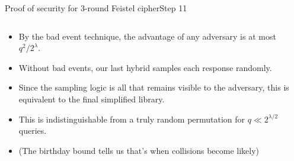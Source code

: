\documentclass[aspectratio=169, lualatex, handout]{beamer}
\begin{document}
\begin{frame}{Proof of security for 3-round Feistel cipher}{Step 11}
	\begin{columns}[c]
		\begin{column}{0.6\textwidth}
			\begin{itemize}[<+->]
				\item By the bad event technique, the advantage of any adversary is at most $q^2/2^{\lambda}$.
				\item Without bad events, our last hybrid samples each response randomly.
				\item Since the sampling logic is all that remains visible to the adversary, this is equivalent to the final simplified library.
				\item This is indistinguishable from a truly random permutation for $q \ll 2^{\lambda/2}$ queries.
				\item (The birthday bound tells us that's when collisions become likely)
			\end{itemize}
		\end{column}
		\begin{column}{0.4\textwidth}
			\vspace{-1.5cm}
			\begin{center}
			\end{center}
		\end{column}
	\end{columns}
\end{frame}
\end{document}
